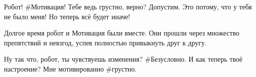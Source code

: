 \begin{dialog}
\X Робот!
\R \#Мотивация!
\X Тебе ведь грустно, верно?
\R Допустим.
\X Это потому, что у тебя не было меня! Но теперь всё будет иначе!
\end{dialog}

\begin{monolog}
Долгое время робот и Мотивация были вместе. Они прошли через множество препятствий и невзгод, успев полностью привыкнуть друг к другу.
\end{monolog}

\begin{dialog}
\X Ну так что, робот, ты чувствуешь изменения?
\R \#Безусловно.
\X И как теперь твоё настроение?
\R Мне мотивированно \#грустно.
\end{dialog}